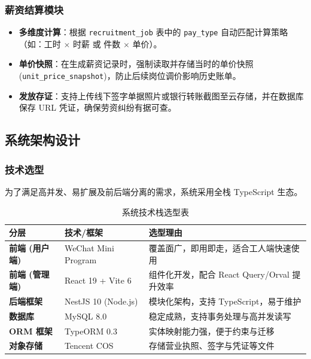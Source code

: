 \documentclass[UTF8,a4paper,12pt]{article}
\begin{document}
\subsubsection{薪资结算模块}
\begin{itemize}
    \item \textbf{多维度计算}：根据 \texttt{recruitment\_job} 表中的 \texttt{pay\_type} 自动匹配计算策略（如：工时 $\times$ 时薪 或 件数 $\times$ 单价）。
    \item \textbf{单价快照}：在生成薪资记录时，强制读取并存储当时的单价快照 (\texttt{unit\_price\_snapshot})，防止后续岗位调价影响历史账单。
    \item \textbf{发放存证}：支持上传线下签字单据照片或银行转账截图至云存储，并在数据库保存 URL 凭证，确保劳资纠纷有据可查。
\end{itemize}

\subsection{系统架构设计}

\subsubsection{技术选型}
为了满足高并发、易扩展及前后端分离的需求，系统采用全栈 TypeScript 生态。

\begin{table}[H]
    \centering
    \caption{系统技术栈选型表}
    \label{tab:tech_stack}
    \renewcommand{\arraystretch}{1.2}
    \begin{tabular}{|l|l|l|}
        \hline
        \rowcolor{gray!15} \textbf{分层} & \textbf{技术/框架} & \textbf{选型理由} \\ \hline
        \textbf{前端 (用户端)} & WeChat Mini Program & 覆盖面广，即用即走，适合工人端快速使用 \\ \hline
        \textbf{前端 (管理端)} & React 19 + Vite 6 & 组件化开发，配合 React Query/Orval 提升效率 \\ \hline
        \textbf{后端框架} & NestJS 10 (Node.js) & 模块化架构，支持 TypeScript，易于维护 \\ \hline
        \textbf{数据库} & MySQL 8.0 & 稳定成熟，支持事务处理与高并发读写 \\ \hline
        \textbf{ORM 框架} & TypeORM 0.3 & 实体映射能力强，便于约束与迁移 \\ \hline
        \textbf{对象存储} & Tencent COS & 存储营业执照、签字与凭证等文件 \\ \hline
    \end{tabular}
\end{table}
\end{document}

